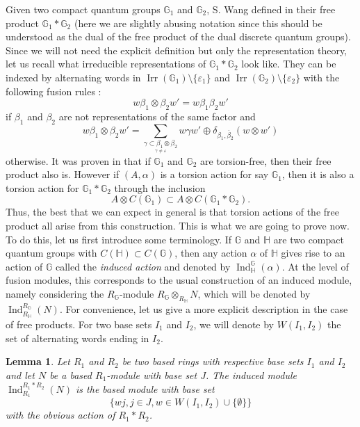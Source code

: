\documentclass[a4paper, 11pt]{amsart}
\theoremstyle{plain}
\newtheorem{lem}[thm]{Lemma}
\theoremstyle{definition}
\theoremstyle{remark}
\DeclareMathOperator{\Ind}{Ind}
\DeclareMathOperator{\Irr}{Irr}
\newcommand{\G}{\mathbb{G}}
\newcommand{\HH}{\mathbb{H}}
\begin{document}
Given two compact quantum groups $\G_{1}$ and $\G_{2}$, S. Wang defined in \cite{wang1995free} their free product $\G_{1}\ast\G_{2}$ (here we are slightly abusing notation since this should be understood as the dual of the free product of the dual discrete quantum groups). Since we will not need the explicit definition but only the representation theory, let us recall what irreducible representations of $\G_{1}\ast\G_{2}$ look like. They can be indexed by alternating words in $\Irr(\G_{1})\setminus\{\varepsilon_{1}\}$ and $\Irr(\G_{2})\setminus\{\varepsilon_{2}\}$ with the following fusion rules :
\begin{equation*}
w\beta_{1}\otimes \beta_{2} w' = w\beta_{1}\beta_{2} w'
\end{equation*}
if $\beta_{1}$ and $\beta_{2}$ are not representations of the same factor and
\begin{equation*}
w\beta_{1}\otimes \beta_{2} w' = \sum_{\underset{\gamma\neq\varepsilon}{\gamma\subset\beta_{1}\otimes \beta_{2}}}w\gamma w' \oplus \delta_{\beta_{1}, \overline{\beta}_{2}}(w\otimes w')
\end{equation*}
otherwise. It was proven in \cite[Thm 1.25]{arano2015torsion} that if $\G_{1}$ and $\G_{2}$ are torsion-free, then their free product also is. However if $(A, \alpha)$ is a torsion action for say $\G_{1}$, then it is also a torsion action for $\G_{1}\ast\G_{2}$ through the inclusion
\begin{equation*}
A\otimes C(\G_{1})\subset A\otimes C(\G_{1}\ast\G_{2}).
\end{equation*}
Thus, the best that we can expect in general is that torsion actions of the free product all arise from this construction. This is what we are going to prove now. To do this, let us first introduce some terminology. If $\G$ and $\HH$ are two compact quantum groups with $C(\HH)\subset C(\G)$, then any action $\alpha$ of $\HH$ gives rise to an action of $\G$ called the \emph{induced action} and denoted by $\Ind_{\HH}^{\G}(\alpha)$. At the level of fusion modules, this corresponds to the usual construction of an induced module, namely considering the $R_{\G}$-module $R_{\G}\otimes_{R_{\HH}}N$, which will be denoted by $\Ind_{R_{\HH}}^{R_{\G}}(N)$. For convenience, let us give a more explicit description in the case of free products. For two base sets $I_{1}$ and $I_{2}$, we will denote by $W(I_{1}, I_{2})$ the set of alternating words ending in $I_{2}$.

\begin{lem}\label{lem:inducedfreeproduct}
Let $R_{1}$ and $R_{2}$ be two based rings with respective base sets $I_{1}$ and $I_{2}$ and let $N$ be a based $R_{1}$-module with base set $J$. The induced module $\Ind_{R_{1}}^{R_{1}\ast R_{2}}(N)$ is the based module with base set
\begin{equation*}
\{wj, j\in J, w\in W(I_{1}, I_{2})\cup\{\emptyset\}\}
\end{equation*}
with the obvious action of $R_{1}\ast R_{2}$.
\end{lem}
\end{document}
